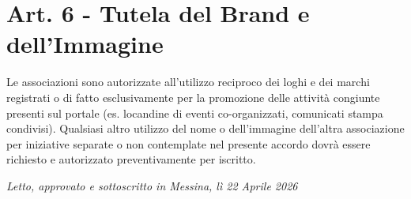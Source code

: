 \documentclass[a4paper,11pt]{article}
\begin{document}
\section*{Art. 6 - Tutela del Brand e dell'Immagine}

Le associazioni sono autorizzate all'utilizzo reciproco dei loghi e dei marchi registrati o di fatto esclusivamente per la promozione delle attività congiunte presenti sul portale (es. locandine di eventi co-organizzati, comunicati stampa condivisi). Qualsiasi altro utilizzo del nome o dell'immagine dell'altra associazione per iniziative separate o non contemplate nel presente accordo dovrà essere richiesto e autorizzato preventivamente per iscritto.

\textit{Letto, approvato e sottoscritto in Messina, lì 22 Aprile 2026}
\end{document}
